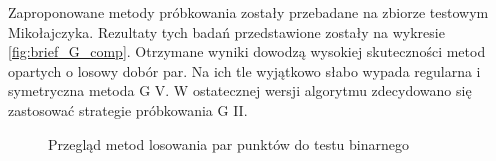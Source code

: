 Zaproponowane metody próbkowania zostały przebadane na zbiorze testowym Mikołajczyka. Rezultaty tych badań przedstawione zostały na wykresie \ref{fig:brief_G_comp}. Otrzymane wyniki dowodzą wysokiej skuteczności metod opartych o losowy dobór par. Na ich tle wyjątkowo słabo wypada regularna i symetryczna metoda G V. W ostatecznej wersji algorytmu zdecydowano się zastosować strategie próbkowania G II.
\begin{figure}
\centering

\caption{Przegląd metod losowania par punktów do testu binarnego}
\label{fig:brief_dist}
\end{figure}

